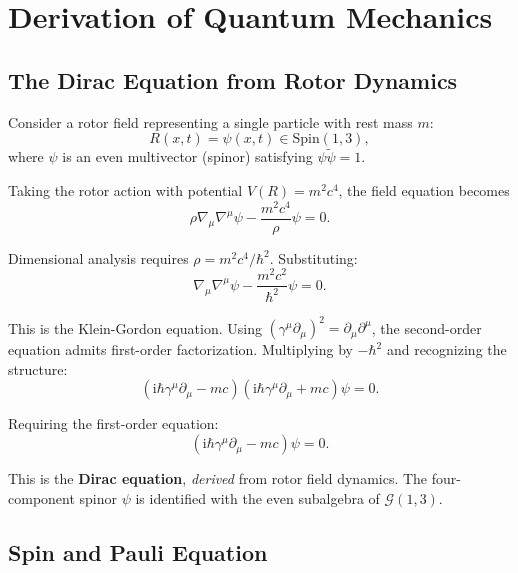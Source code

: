 \documentclass[11pt,a4paper]{article}
\numberwithin{equation}{section}
\theoremstyle{plain}
\theoremstyle{definition}
\theoremstyle{remark}
\newcommand{\Cl}{\mathcal{G}}               %
\newcommand{\rev}[1]{\widetilde{#1}}       %
\newcommand{\Spin}{\mathrm{Spin}}
\newcommand{\ii}{\mathrm{i}}
\begin{document}
\section{Derivation of Quantum Mechanics}
\label{sec:quantum}

\subsection{The Dirac Equation from Rotor Dynamics}

Consider a rotor field representing a single particle with rest mass $m$:
\begin{equation}
R(x,t) = \psi(x,t) \in \Spin(1,3),
\end{equation}
where $\psi$ is an even multivector (spinor) satisfying $\psi\rev{\psi} = 1$.

Taking the rotor action with potential $V(R) = m^2c^4$, the field equation becomes
\begin{equation}
\rho\nabla_\mu\nabla^\mu\psi - \frac{m^2c^4}{\rho}\psi = 0.
\end{equation}

Dimensional analysis requires $\rho = m^2c^4/\hbar^2$. Substituting:
\begin{equation}
\nabla_\mu\nabla^\mu\psi - \frac{m^2c^2}{\hbar^2}\psi = 0.
\end{equation}

This is the Klein-Gordon equation. Using $(\gamma^\mu\partial_\mu)^2 = \partial_\mu\partial^\mu$, the second-order equation admits first-order factorization. Multiplying by $-\hbar^2$ and recognizing the structure:
\begin{equation}
(\ii\hbar\gamma^\mu\partial_\mu - mc)(\ii\hbar\gamma^\mu\partial_\mu + mc)\psi = 0.
\end{equation}

Requiring the first-order equation:
\begin{equation}
\boxed{(\ii\hbar\gamma^\mu\partial_\mu - mc)\psi = 0.}
\label{eq:dirac-derived}
\end{equation}

This is the \textbf{Dirac equation}, \emph{derived} from rotor field dynamics. The four-component spinor $\psi$ is identified with the even subalgebra of $\Cl(1,3)$.

\subsection{Spin and Pauli Equation}
\end{document}
